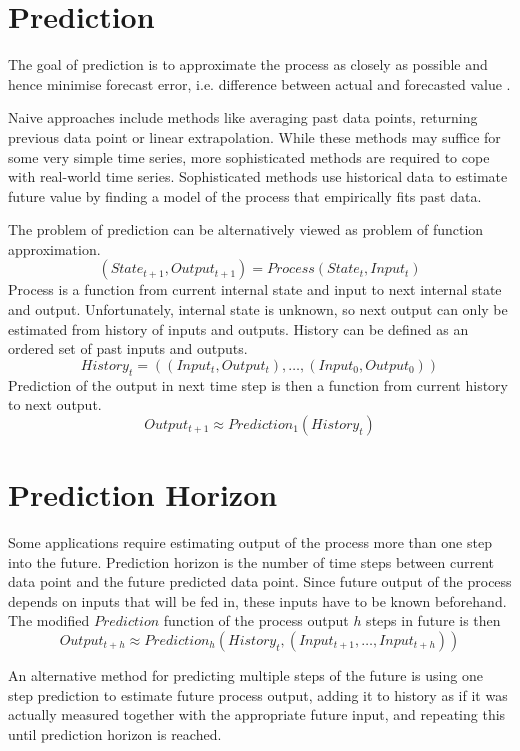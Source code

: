 \documentclass[12pt,oneside]{fithesis2}
\begin{document}
\section{Prediction}
The goal of prediction is to approximate the process as closely as possible and hence minimise forecast error, i.e. difference between actual and forecasted value \cite{timeseries}.\par
Naive approaches include methods like averaging past data points, returning previous data point or linear extrapolation. While these methods may suffice for some very simple time series, more sophisticated methods are required to cope with real-world time series. Sophisticated methods use historical data to estimate future value by finding a model of the process that empirically fits past data. \par
The problem of prediction can be alternatively viewed as problem of function approximation.
	$$\left(State_{t+1}, Output_{t+1}\right) = Process(State_t, Input_t)$$
Process is a function from current internal state and input to next internal state and output. Unfortunately, internal state is unknown, so next output can only be estimated from history of inputs and outputs. History can be defined as an ordered set of past inputs and outputs.
	$$History_t = \left( (Input_{t}, Output_{t}), \dots, (Input_{0}, Output_{0}) \right)$$
Prediction of the output in next time step is then a function from current history to next output.
	$$Output_{t+1} \approx Prediction_{1}( History_t )$$

\section{Prediction Horizon}
Some applications require estimating output of the process more than one step into the future. Prediction horizon is the number of time steps between current data point and the future predicted data point. Since future output of the process depends on inputs that will be fed in, these inputs have to be known beforehand. The modified $Prediction$ function of the process output $h$ steps in future is then
	$$Output_{t+h} \approx Prediction_{h}( History_t, (Input_{t+1}, \dots, Input_{t+h}) )$$

An alternative method for predicting multiple steps of the future is using one step prediction to estimate future process output, adding it to history as if it was actually measured together with the appropriate future input, and repeating this until prediction horizon is reached.
\end{document}
